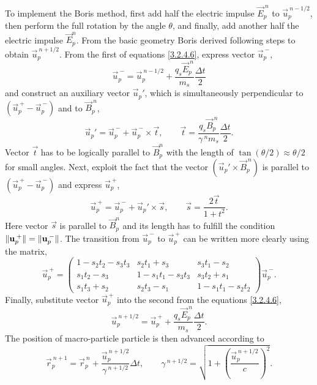 To implement the Boris method, first add half the electric impulse $ \vec{E}_{p}^{\:n} $ to $ \vec{u}_{p}^{\:n-1/2} $, then perform the full rotation by the angle $ \theta $, and finally, add another half the electric impulse $ \vec{E}_{p}^{n} $. From the basic geometry Boris derived following steps to obtain $ \vec{u}_{p}^{\:n + 1/2} $. From the first of equations \ref{3.2.4.6}, express vector $ \vec{u}_{p}^{\:-} $,
\begin{equation}
\vec{u}_{p}^{\:-} = \vec{u}_{p}^{\:n-1/2} +  \frac{q_{s} \vec{E}_{p}^{\:n}}{m_{s}} \frac{\Delta t}{2}
\end{equation}
and construct an auxiliary vector $ \vec{u}_{p}\!' $, which is simultaneously perpendicular to $ \left(\vec{u}_{p}^{\:+} - \vec{u}_{p}^{\:-} \right) $ and to $ \vec{B}_{p}^{\:n} $,
\begin{equation}
\vec{u}_{p}\!' = \vec{u}_{p}^{\:-} + \vec{u}_{p}^{\:-} \times \vec{t}, \qquad \vec{t} = \frac{q_{s} \vec{B}_{p}^{\:n}}{\gamma^{\:n} m_{s}} \frac{\Delta t}{2}.
\end{equation}
Vector $ \vec{t} $ has to be logically parallel to $ \vec{B}_{p}^{n} $ with the length of $ \tan \left(\theta/2\right) \approx \theta/2 $ for small angles. Next, exploit the fact that the vector $ (\vec{u}_{p}\!' \times \vec{B}_{p}^{\:n}) $ is parallel to $ \left(\vec{u}_{p}^{\:+} - \vec{u}_{p}^{\:-} \right) $ and express $ \vec{u}_{p}^{\:+} $,
\begin{equation}
\vec{u}_{p}^{\:+} = \vec{u}_{p}^{\:-} + \vec{u}_{p}\!' \times \vec{s}, \qquad \vec{s} = \frac{2\vec{t}}{1 + t^2}.
\end{equation}
Here vector $ \vec{s} $ is parallel to $ \vec{B}_{p}^{n} $ and its length has to fulfill the condition $ \lVert\mathbf{u}_{p}^{\:+}\rVert = \lVert\mathbf{u}_{p}^{\:-}\rVert $. The transition from $ \vec{u}_{p}^{\:-} $ to $ \vec{u}_{p}^{\:+} $ can be written more clearly using the matrix,
\begingroup
\renewcommand*{\arraystretch}{1.8}
\begin{equation}
\vec{u}_{p}^{\:+} =  \begin{pmatrix}
  1 - s_{2}t_{2} - s_{3}t_{3} & s_{2}t_{1} + s_{3} & s_{3}t_{1} - s_{2} \\
  s_{1}t_{2} - s_{3} & 1 - s_{1}t_{1} - s_{3}t_{3} & s_{3}t_{2} + s_{1} \\
  s_{1}t_{3} + s_{2} & s_{2}t_{3} - s_{1} & 1 - s_{1}t_{1} - s_{2}t_{2}
 \end{pmatrix}
\vec{u}_{p}^{\:-}.
\end{equation}
\endgroup
Finally, substitute vector $ \vec{u}_{p}^{\:+} $ into the second from the equations \ref{3.2.4.6},
\begin{equation}
\vec{u}_{p}^{\:n+1/2} = \vec{u}_{p}^{\:+} + \frac{q_{s} \vec{E}_{p}^{\:n}}{m_{s}} \frac{\Delta t}{2}.
\end{equation}
The position of macro-particle particle is then advanced according to
\begin{equation}
\vec{r}_{p}^{\:n+1} = \vec{r}_{p}^{\:n} + \frac{\vec{u}_{p}^{\:n + 1/2}}{\gamma^{\:n + 1/2}} \Delta t, \qquad \gamma^{\:n + 1/2} = \sqrt{1 + \left(\frac{\vec{u}_{p}^{\:n + 1/2}}{c}\right)^{2}}.
\end{equation}


